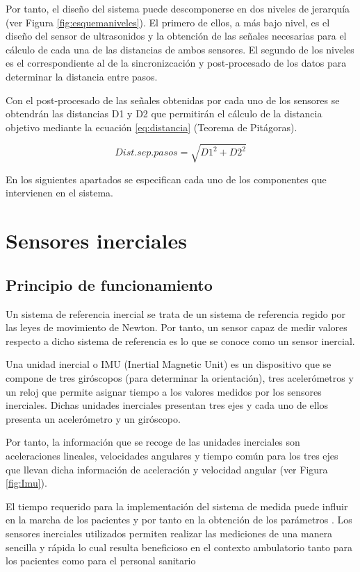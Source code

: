 Por tanto, el diseño del sistema puede descomponerse en dos niveles de jerarquía  (ver Figura \ref{fig:esquemaniveles}). El primero de ellos, a más bajo nivel, es el diseño del sensor de ultrasonidos y la obtención de las señales necesarias para el cálculo de cada una de las distancias de ambos sensores. El segundo de los niveles es el correspondiente al de la sincronizcación y post-procesado de los datos para determinar la distancia entre pasos.

 Con el  post-procesado de las señales obtenidas por cada uno de los sensores se obtendrán las distancias D1 y D2 que permitirán el cálculo de la distancia objetivo mediante la ecuación \ref{eq:distancia} (Teorema de Pitágoras).

\begin{equation}\label{eq:distancia}
Dist.sep.pasos = \sqrt{D1^2 + D2^2}
\end{equation}


En los siguientes apartados se especifican cada uno de los componentes que intervienen en el sistema. 
\section{Sensores inerciales}
\subsection{Principio de funcionamiento}

Un sistema de referencia inercial se trata de un sistema de referencia regido por las leyes de movimiento de Newton. Por tanto, un sensor capaz de medir valores respecto a dicho sistema de referencia es lo que se conoce como un sensor inercial.

Una unidad inercial o IMU (Inertial Magnetic Unit) es un dispositivo que se compone de tres giróscopos (para determinar la orientación), tres acelerómetros y un reloj que permite asignar tiempo a los valores medidos por los sensores inerciales. Dichas unidades inerciales presentan tres ejes y cada uno de ellos presenta un acelerómetro y un giróscopo.

Por tanto, la información que se recoge de las unidades inerciales son aceleraciones lineales, velocidades angulares y tiempo común para los tres ejes que llevan dicha información de aceleración y velocidad angular (ver Figura \ref{fig:Imu}). 


El tiempo requerido para la implementación del sistema de medida puede influir en la marcha de los pacientes y por tanto en la obtención de los parámetros \cite{begona}. Los sensores inerciales utilizados permiten realizar las mediciones de una manera sencilla y rápida lo cual resulta beneficioso en el contexto ambulatorio tanto para los pacientes como para el personal sanitario



